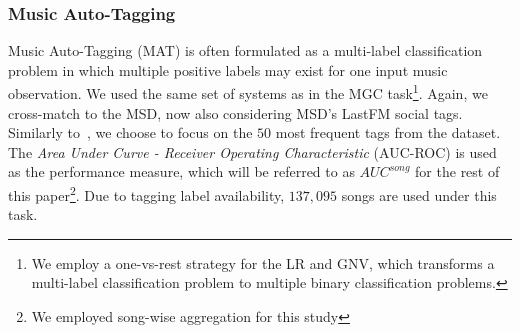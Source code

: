 \documentclass{article}
\begin{document}
\subsubsection{Music Auto-Tagging}\label{sec:exp:task:autotagging}
Music Auto-Tagging (MAT) is often formulated as a multi-label classification problem in which multiple positive labels may exist for one input music observation. We used the same set of systems as in the MGC task\footnote{We employ a one-vs-rest strategy for the LR and GNV, which transforms a multi-label classification problem to multiple binary classification problems.}. Again, we cross-match to the MSD, now also considering MSD's LastFM social tags. Similarly to~\cite{DBLP:conf/ismir/ChoiFSC17}, we choose to focus on the $50$ most frequent tags from the dataset. The \emph{Area Under Curve - Receiver Operating Characteristic} (AUC-ROC) is used as the performance measure, which will be referred to as $AUC^{song}$ for the rest of this paper\footnote{We employed song-wise aggregation for this study}. Due to tagging label availability, $137,095$ songs are used under this task.
\end{document}
